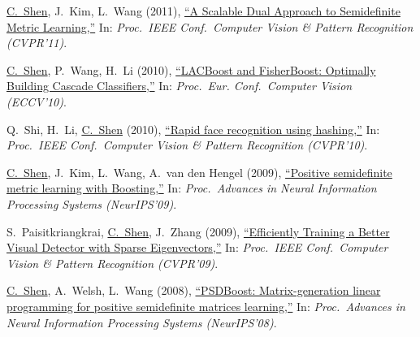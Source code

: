 \documentclass[9pt, a4paper]{article}
\newcommand{\years}[1]{\marginnote{\scriptsize #1}}
\def\highlight{\uline}
\begin{document}
\medskip

\years{2011} \highlight{C.~Shen}, J.~Kim, L.~Wang (2011),
\href{http://www.google.com/search?lr=&ie=UTF-8&oe=UTF-8&q=A+Scalable+Dual+Approach+to+Semidefinite+Metric+Learning+Chunhua+Shen%2C+Junae+Kim%2C+Lei+Wang}{``A Scalable Dual Approach to Semidefinite Metric Learning,{}''}
In: \emph{Proc.\ IEEE Conf.\  Computer Vision \& Pattern Recognition (CVPR'11)}.

\medskip

\years{2010} \highlight{C.~Shen}, P.~Wang, H.~Li (2010),
\href{http://www.google.com/search?lr=&ie=UTF-8&oe=UTF-8&q=LACBoost+and+FisherBoost%3A+Optimally+Building+Cascade+Classifiers+Chunhua+Shen%2C+Peng+Wang%2C+Hanxi+Li}{``{LACBoost} and {FisherBoost}: Optimally Building Cascade Classifiers,{}''}
In: \emph{Proc.\ Eur. Conf.\  Computer Vision (ECCV'10)}.

\medskip

\years{2010} Q.~Shi, H.~Li, \highlight{C.~Shen} (2010),
\href{http://www.google.com/search?lr=&ie=UTF-8&oe=UTF-8&q=Rapid+face+recognition+using+hashing+Qinfeng+Shi%2C+Hanxi+Li%2C+Chunhua+Shen}{``Rapid face recognition using hashing,{}''}
In: \emph{Proc.\ IEEE Conf.\  Computer Vision \& Pattern Recognition (CVPR'10)}.

\medskip

\years{2009} \highlight{C.~Shen}, J.~Kim, L.~Wang, A.~van den Hengel (2009),
\href{http://www.google.com/search?lr=&ie=UTF-8&oe=UTF-8&q=Positive+semidefinite+metric+learning+with+Boosting+Chunhua+Shen%2C+Junae+Kim%2C+Lei+Wang%2C+Anton+van+den+Hengel}{``Positive semidefinite metric learning with Boosting,{}''}
In: \emph{Proc.\ Advances in Neural Information Processing Systems (NeurIPS'09)}.

\medskip

\years{2009} S.~Paisitkriangkrai, \highlight{C.~Shen}, J.~Zhang (2009),
\href{http://www.google.com/search?lr=&ie=UTF-8&oe=UTF-8&q=Efficiently+Training+a+Better+Visual+Detector+with+Sparse+Eigenvectors+Sakrapee+Paisitkriangkrai%2C+Chunhua+Shen%2C+Jian+Zhang}{``Efficiently Training a Better Visual Detector with Sparse Eigenvectors,{}''}
In: \emph{Proc.\ IEEE Conf.\  Computer Vision \& Pattern Recognition (CVPR'09)}.

\medskip

\years{2008} \highlight{C.~Shen}, A.~Welsh, L.~Wang (2008),
\href{http://www.google.com/search?lr=&ie=UTF-8&oe=UTF-8&q=PSDBoost%3A+Matrix-generation+linear+programming+for+positive+semidefinite+matrices+learning+Chunhua+Shen%2C+Alan+Welsh%2C+Lei+Wang}{``{PSDB}oost: Matrix-generation linear programming for positive semidefinite matrices learning,{}''}
In: \emph{Proc.\ Advances in Neural Information Processing Systems (NeurIPS'08)}.
\end{document}
